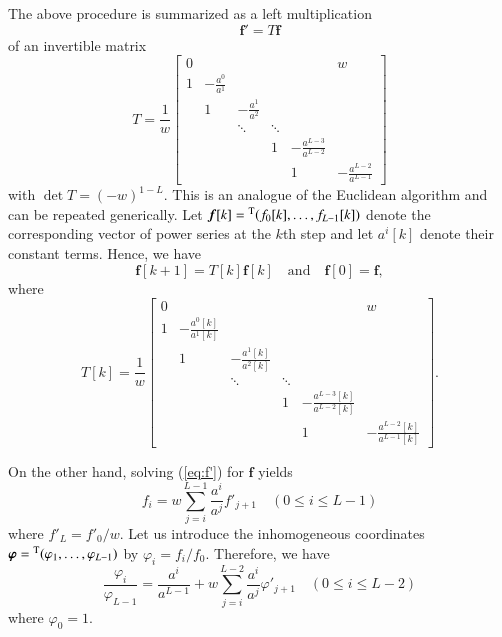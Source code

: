 \documentclass[12pt]{article}
\numberwithin{equation}{section}
\begin{document}
The above procedure
 is summarized as a left multiplication
\begin{equation} \label{eq:f'}
{\boldsymbol f'}=T
{\boldsymbol f}
\end{equation}
of an invertible matrix
\[
T=
\frac{1}{w}
 \begin{bmatrix}
0 &  &&&&w
\\
1&-\frac{a^0}{a^1}&&&&
\\
&1&-\frac{a^1}{a^2}&&&
\\
& &\ddots& \ddots&
\\ 
&&&1&-\frac{a^{L-3}}{a^{L-2}}&
\\
 & &&&1&-\frac{a^{L-2}}{a^{L-1}}
\end{bmatrix}
\]
with $\det T=(-w)^{1-L}$. 
This is
an analogue of the Euclidean algorithm
and can be repeated generically. 
Let 
${\boldsymbol f}[k]={}^{\rm T}(f_0[k],\ldots,f_{L-1}[k])$  
denote the corresponding vector of power series at the $k$th step and let $a^i[k]$ 
denote their constant terms.
Hence, we have
\begin{equation}  \label{eq:fn}
{\boldsymbol f}[k+1]=T[k]{\boldsymbol f}[k]
\quad \text{and}
\quad
{\boldsymbol f}[0]={\boldsymbol f},
\end{equation}
where
\begin{equation}
\label{eq:Tn}
T[k]=\frac{1}{w}
 \begin{bmatrix}
0 &  &&&&w
\\
1&-\frac{a^0[k]}{a^1[k]}&&&&
\\
&1&-\frac{a^1[k]}{a^2[k]}&&&
\\
& &\ddots& \ddots&
\\ 
&&&1&-\frac{a^{L-3}[k]}{a^{L-2}[k]}&
\\
 & &&&1&-\frac{a^{L-2}[k]}{a^{L-1}[k]}
\end{bmatrix}.
\end{equation}





On the other hand,
solving (\ref{eq:f'})
 for $\boldsymbol f$ yields
\[
f_i= w \sum_{j=i}^{L-1}
\frac{a^i}{a^j}f'_{j+1}
\quad (0 \leq i \leq L-1)
\]
where $f'_L=f'_0/w$.
Let us introduce the 
inhomogeneous coordinates 
${\boldsymbol \varphi}={}^{\rm T}(\varphi_1,\ldots,\varphi_{L-1})$ by $\varphi_i=f_i/f_0$.
Therefore, we have
\begin{equation}  \label{eq:phi}
\frac{\varphi_i}{\varphi_{L-1}}=
\frac{a^i}{a^{L-1}}+
w \sum_{j=i}^{L-2} \frac{a^i}{a^j} \varphi'_{j+1}
\quad (0 \leq i  \leq L-2)
\end{equation}
where $\varphi_0=1$.
\end{document}
